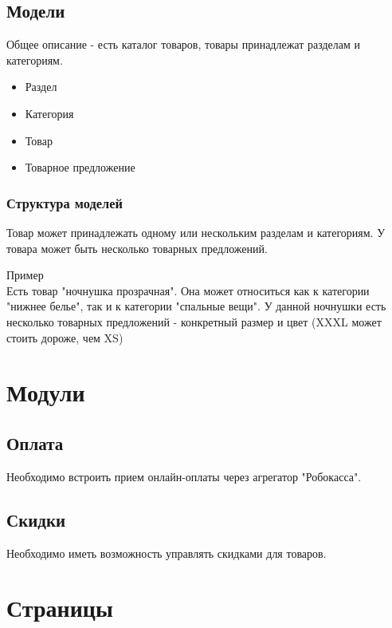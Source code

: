 \documentclass[DIV=calc, paper=a4, fontsize=11pt]{scrartcl} %
\begin{document}
\subsection{Модели}
Общее описание - есть каталог товаров, товары принадлежат разделам и категориям.

\begin{itemize}
	\item Раздел
	\item Категория
	\item Товар
	\item Товарное предложение
\end{itemize}

\subsubsection{Структура моделей}

Товар может принадлежать одному или нескольким разделам и категориям. У товара может быть несколько товарных предложений.
\begin{framed}
Пример
\\[0.5cm]
Есть товар "ночнушка прозрачная". Она может относиться как к категории "нижнее белье", так и к категории "спальные вещи". У данной ночнушки есть несколько товарных предложений - конкретный размер и цвет (XXXL может стоить дороже, чем XS)
\end{framed}


\section{Модули}

\subsection{Оплата}
Необходимо встроить прием онлайн-оплаты через агрегатор "Робокасса".

\subsection{Скидки}
Необходимо иметь возможность управлять скидками для товаров. 

\section{Страницы}
\end{document}
